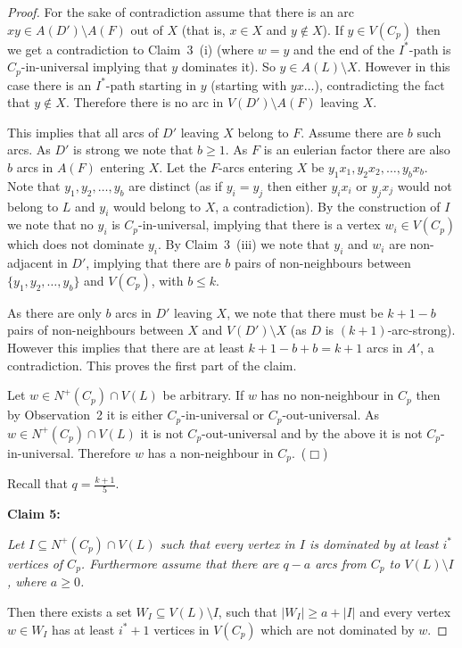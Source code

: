 \documentclass{article}
\newcommand{\smallqed}{\hfill {\tiny ($\Box$)}}
\newcommand{\2}{\vspace{2mm}}
\theoremstyle{plain}
\theoremstyle{definition}
\begin{document}
\begin{proof}
For the sake of contradiction assume that there is an arc $xy \in A(D') \setminus A(F)$ out of $X$ (that is,
$ x \in X$ and $y \not\in X$). If $y \in V(C_p)$ then we get a contradiction to Claim~3~(i) (where $w=y$ and
the end of the $I^*$-path is $C_p$-in-universal implying that $y$ dominates it). So $y \in A(L) \setminus X$.
However in this case there is an $I^*$-path starting in $y$ (starting with $y x \ldots$), contradicting the 
fact that $ y \not\in X$.  Therefore there is no arc in $V(D') \setminus A(F)$ leaving $X$.

This implies that all arcs of $D'$ leaving $X$ belong to $F$. Assume there are $b$ such arcs. As $D'$ is 
strong we note that $b \geq 1$. As $F$ is an eulerian factor there are also $b$ arcs in $A(F)$
entering $X$.  Let the $F$-arcs entering $X$ be $y_1x_1, y_2x_2, \ldots, y_b x_b$.
Note that $y_1,y_2,\ldots ,y_b$ are distinct (as if $y_i=y_j$ then either $y_ix_i$ or $y_jx_j$ would not belong to $L$ and
$y_i$ would belong to $X$, a contradiction). By the construction of $I$ we note that no $y_i$ is $C_p$-in-universal, implying
that there is a vertex $w_i \in V(C_p)$ which does not dominate $y_i$. By Claim~3~(iii) we note that 
$y_i$ and $w_i$ are non-adjacent in $D'$, implying that there are $b$ pairs of non-neighbours between 
$\{y_1,y_2,\ldots,y_b\}$ and $V(C_p)$, with $b\leq k$.

As there are only $b$ arcs in $D'$ leaving $X$, we note that there must be $k+1-b$ pairs of non-neighbours between 
$X$ and $V(D')\setminus X$ (as $D$ is $(k+1)$-arc-strong). However this implies that there are at least
$k+1-b + b = k+1$ arcs in $A'$, a contradiction. This proves the first part of the claim.

Let $w \in N^+(C_p) \cap V(L)$ be arbitrary. If $w$ has no non-neighbour in $C_p$ then by Observation~2 it is 
either $C_p$-in-universal or $C_p$-out-universal. As $w \in N^+(C_p) \cap V(L)$ it is not $C_p$-out-universal 
and by the above it is not $C_p$-in-universal. Therefore $w$ has a non-neighbour in $C_p$.~\smallqed{}


\2

Recall that $q=\frac{k+1}{5}$.

{\bf Claim 5:} {\em Let $I \subseteq N^+(C_p) \cap V(L)$ such that every vertex in $I$ is dominated 
by at least $i^*$ vertices of $C_p$. Furthermore assume that there are $q-a$ arcs from $C_p$ to 
$V(L) \setminus I$, where $a \geq 0$.

Then there exists a set $W_I \subseteq  V(L) \setminus I$, such that $|W_I| \geq a + |I|$ and
every vertex $w \in W_I$ has at least $i^*+1$ vertices in $V(C_p)$ which are not dominated by $w$.}


\end{proof}
\end{document}
